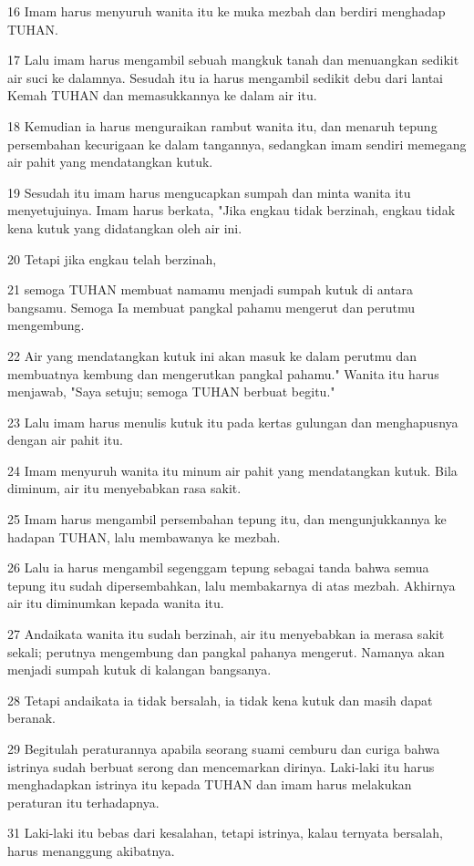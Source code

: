 \par 16 Imam harus menyuruh wanita itu ke muka mezbah dan berdiri menghadap TUHAN.
\par 17 Lalu imam harus mengambil sebuah mangkuk tanah dan menuangkan sedikit air suci ke dalamnya. Sesudah itu ia harus mengambil sedikit debu dari lantai Kemah TUHAN dan memasukkannya ke dalam air itu.
\par 18 Kemudian ia harus menguraikan rambut wanita itu, dan menaruh tepung persembahan kecurigaan ke dalam tangannya, sedangkan imam sendiri memegang air pahit yang mendatangkan kutuk.
\par 19 Sesudah itu imam harus mengucapkan sumpah dan minta wanita itu menyetujuinya. Imam harus berkata, "Jika engkau tidak berzinah, engkau tidak kena kutuk yang didatangkan oleh air ini.
\par 20 Tetapi jika engkau telah berzinah,
\par 21 semoga TUHAN membuat namamu menjadi sumpah kutuk di antara bangsamu. Semoga Ia membuat pangkal pahamu mengerut dan perutmu mengembung.
\par 22 Air yang mendatangkan kutuk ini akan masuk ke dalam perutmu dan membuatnya kembung dan mengerutkan pangkal pahamu." Wanita itu harus menjawab, "Saya setuju; semoga TUHAN berbuat begitu."
\par 23 Lalu imam harus menulis kutuk itu pada kertas gulungan dan menghapusnya dengan air pahit itu.
\par 24 Imam menyuruh wanita itu minum air pahit yang mendatangkan kutuk. Bila diminum, air itu menyebabkan rasa sakit.
\par 25 Imam harus mengambil persembahan tepung itu, dan mengunjukkannya ke hadapan TUHAN, lalu membawanya ke mezbah.
\par 26 Lalu ia harus mengambil segenggam tepung sebagai tanda bahwa semua tepung itu sudah dipersembahkan, lalu membakarnya di atas mezbah. Akhirnya air itu diminumkan kepada wanita itu.
\par 27 Andaikata wanita itu sudah berzinah, air itu menyebabkan ia merasa sakit sekali; perutnya mengembung dan pangkal pahanya mengerut. Namanya akan menjadi sumpah kutuk di kalangan bangsanya.
\par 28 Tetapi andaikata ia tidak bersalah, ia tidak kena kutuk dan masih dapat beranak.
\par 29 Begitulah peraturannya apabila seorang suami cemburu dan curiga bahwa istrinya sudah berbuat serong dan mencemarkan dirinya. Laki-laki itu harus menghadapkan istrinya itu kepada TUHAN dan imam harus melakukan peraturan itu terhadapnya.
\par 31 Laki-laki itu bebas dari kesalahan, tetapi istrinya, kalau ternyata bersalah, harus menanggung akibatnya.

